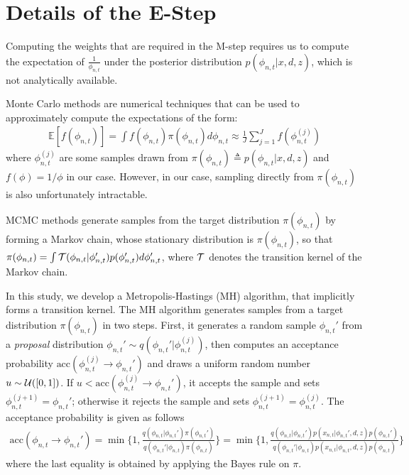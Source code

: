 \section{Details of the E-Step}
\label{sec:e-step}

Computing the weights that are required in the M-step requires us to compute the expectation of $\frac1{\phi_{n,t}}$ under the posterior distribution $p(\phi_{n,t}|x,d,z)$, which is not analytically available. 

Monte Carlo methods are numerical techniques that can be used to approximately compute the expectations of the form:
\begin{align}
\mathds{E}[f(\phi_{n,t})] = \int f(\phi_{n,t}) \pi(\phi_{n,t}) d\phi_{n,t} \approx \frac1{J} \sum_{j=1}^J f(\phi_{n,t}^{(j)}) \label{eqn:mc}
\end{align}
where $\phi_{n,t}^{(j)}$ are some samples drawn from $\pi(\phi_{n,t}) \triangleq p(\phi_{n,t}|x,d,z)$ and $f(\phi) = 1/\phi$ in our case. However, in our case, sampling directly from $\pi(\phi_{n,t})$ is also unfortunately intractable.


\ac{MCMC} methods generate samples from the target distribution $\pi(\phi_{n,t})$ by forming a Markov chain, whose stationary distribution is $\pi(\phi_{n,t})$, 
%
so that $\pi(\phi_{n,t}) = \int {\cal T}(\phi_{n,t}|\phi_{n,t}') p(\phi_{n,t}') d\phi_{n,t}'$, where ${\cal T}$ denotes the transition kernel of the Markov chain. 

In this study, we develop a Metropolis-Hastings (MH) algorithm, that implicitly forms a transition kernel. 
%
The MH algorithm generates samples from a target distribution $\pi(\phi_{n,t})$ in two steps. First, it generates a random sample $\phi_{n,t}'$ from a \emph{proposal} distribution $\phi_{n,t}' \sim q(\phi_{n,t}'|\phi_{n,t}^{(j)})$, then computes an acceptance probability $\text{acc}(\phi_{n,t}^{(j)} \rightarrow \phi_{n,t}')$ and draws a uniform random number $u \sim {\cal U}([0, 1])$. If $u < \text{acc}(\phi_{n,t}^{(j)} \rightarrow \phi_{n,t}')$, it accepts the sample and sets $\phi_{n,t}^{(j+1)} = \phi_{n,t}'$; otherwise it rejects the sample and sets $\phi_{n,t}^{(j+1)} = \phi_{n,t}^{(j)}$. The acceptance probability is given as follows
\begin{align}
\text{acc}(\phi_{n,t} \rightarrow \phi_{n,t}') = \min \Bigr\{1, \frac{q(\phi_{n,t}|\phi_{n,t}') \pi(\phi_{n,t}')}{q(\phi_{n,t}'|\phi_{n,t}) \pi(\phi_{n,t})}\Bigr\} = \min \Bigr\{1, \frac{q(\phi_{n,t}|\phi_{n,t}') p(x_{n,t}|\phi_{n,t}',d,z) p(\phi_{n,t}') }{q(\phi_{n,t}'|\phi_{n,t}) p(x_{n,t}|\phi_{n,t},d,z) p(\phi_{n,t}) }\Bigr\}
\end{align}
where the last equality is obtained by applying the Bayes rule on $\pi$. 

